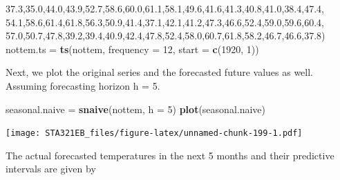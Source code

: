 \documentclass[
]{book}
\newenvironment{Shaded}{\begin{snugshade}}{\end{snugshade}}
\newcommand{\AttributeTok}[1]{\textcolor[rgb]{0.13,0.29,0.53}{#1}}
\newcommand{\DecValTok}[1]{\textcolor[rgb]{0.00,0.00,0.81}{#1}}
\newcommand{\FloatTok}[1]{\textcolor[rgb]{0.00,0.00,0.81}{#1}}
\newcommand{\FunctionTok}[1]{\textcolor[rgb]{0.13,0.29,0.53}{\textbf{#1}}}
\newcommand{\NormalTok}[1]{#1}
\newcommand{\OtherTok}[1]{\textcolor[rgb]{0.56,0.35,0.01}{#1}}
\begin{document}
\begin{Shaded}
\begin{Highlighting}[]
          \FloatTok{37.3}\NormalTok{,}\FloatTok{35.0}\NormalTok{,}\FloatTok{44.0}\NormalTok{,}\FloatTok{43.9}\NormalTok{,}\FloatTok{52.7}\NormalTok{,}\FloatTok{58.6}\NormalTok{,}\FloatTok{60.0}\NormalTok{,}\FloatTok{61.1}\NormalTok{,}\FloatTok{58.1}\NormalTok{,}\FloatTok{49.6}\NormalTok{,}\FloatTok{41.6}\NormalTok{,}\FloatTok{41.3}\NormalTok{,}\FloatTok{40.8}\NormalTok{,}\FloatTok{41.0}\NormalTok{,}\FloatTok{38.4}\NormalTok{,}\FloatTok{47.4}\NormalTok{,}
          \FloatTok{54.1}\NormalTok{,}\FloatTok{58.6}\NormalTok{,}\FloatTok{61.4}\NormalTok{,}\FloatTok{61.8}\NormalTok{,}\FloatTok{56.3}\NormalTok{,}\FloatTok{50.9}\NormalTok{,}\FloatTok{41.4}\NormalTok{,}\FloatTok{37.1}\NormalTok{,}\FloatTok{42.1}\NormalTok{,}\FloatTok{41.2}\NormalTok{,}\FloatTok{47.3}\NormalTok{,}\FloatTok{46.6}\NormalTok{,}\FloatTok{52.4}\NormalTok{,}\FloatTok{59.0}\NormalTok{,}\FloatTok{59.6}\NormalTok{,}\FloatTok{60.4}\NormalTok{,}
          \FloatTok{57.0}\NormalTok{,}\FloatTok{50.7}\NormalTok{,}\FloatTok{47.8}\NormalTok{,}\FloatTok{39.2}\NormalTok{,}\FloatTok{39.4}\NormalTok{,}\FloatTok{40.9}\NormalTok{,}\FloatTok{42.4}\NormalTok{,}\FloatTok{47.8}\NormalTok{,}\FloatTok{52.4}\NormalTok{,}\FloatTok{58.0}\NormalTok{,}\FloatTok{60.7}\NormalTok{,}\FloatTok{61.8}\NormalTok{,}\FloatTok{58.2}\NormalTok{,}\FloatTok{46.7}\NormalTok{,}\FloatTok{46.6}\NormalTok{,}\FloatTok{37.8}\NormalTok{)}
\NormalTok{nottem.ts }\OtherTok{=} \FunctionTok{ts}\NormalTok{(nottem, }\AttributeTok{frequency =} \DecValTok{12}\NormalTok{, }\AttributeTok{start =} \FunctionTok{c}\NormalTok{(}\DecValTok{1920}\NormalTok{, }\DecValTok{1}\NormalTok{))}
\end{Highlighting}
\end{Shaded}

Next, we plot the original series and the forecasted future values as well. Assuming forecasting horizon h = 5.

\begin{Shaded}
\begin{Highlighting}[]
\NormalTok{seasonal.naive }\OtherTok{=} \FunctionTok{snaive}\NormalTok{(nottem, }\AttributeTok{h =} \DecValTok{5}\NormalTok{)}
\FunctionTok{plot}\NormalTok{(seasonal.naive)}
\end{Highlighting}
\end{Shaded}

\texttt{[image: STA321EB\_files/figure-latex/unnamed-chunk-199-1.pdf]}

The actual forecasted temperatures in the next 5 months and their predictive intervals are given by
\end{document}
